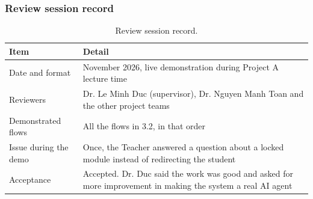 \documentclass[11pt,a4paper]{article}
\begin{document}
\subsubsection{Review session record}
{\small
\begin{longtable}{>{\raggedright\arraybackslash}p{}>{\raggedright\arraybackslash}p{}}
\caption{Review session record.}\\
\toprule
\textbf{Item} & \textbf{Detail} \\
\midrule
\endhead
Date and format & 12 November 2026, live demonstration during Project A lecture time \\
Reviewers & Dr. Le Minh Duc (supervisor), Dr. Nguyen Manh Toan and the other project teams \\
Demonstrated flows & All the flows in 3.2, in that order \\
Issue during the demo & Once, the Teacher answered a question about a locked module instead of redirecting the student \\
Acceptance & Accepted. Dr. Duc said the work was good and asked for more improvement in making the system a real AI agent \\
\bottomrule
\end{longtable}}
\end{document}
